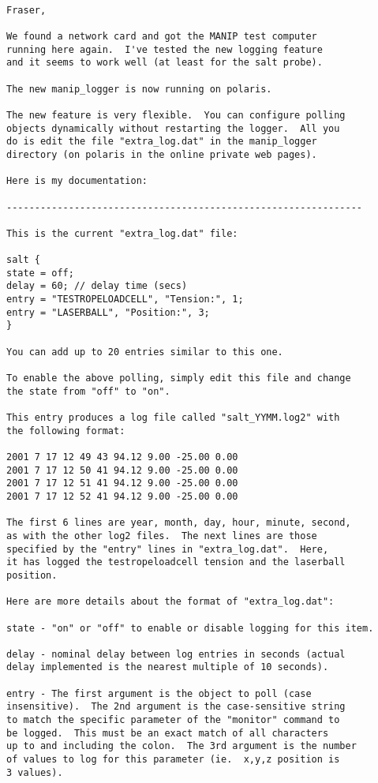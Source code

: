 \begin{verbatim}

Fraser,

We found a network card and got the MANIP test computer
running here again.  I've tested the new logging feature
and it seems to work well (at least for the salt probe).

The new manip_logger is now running on polaris.

The new feature is very flexible.  You can configure polling
objects dynamically without restarting the logger.  All you
do is edit the file "extra_log.dat" in the manip_logger
directory (on polaris in the online private web pages).

Here is my documentation:

--------------------------------------------------------------- 

This is the current "extra_log.dat" file:

salt {
state = off;
delay = 60; // delay time (secs)
entry = "TESTROPELOADCELL", "Tension:", 1;
entry = "LASERBALL", "Position:", 3;
}

You can add up to 20 entries similar to this one.

To enable the above polling, simply edit this file and change
the state from "off" to "on".

This entry produces a log file called "salt_YYMM.log2" with
the following format:

2001 7 17 12 49 43 94.12 9.00 -25.00 0.00
2001 7 17 12 50 41 94.12 9.00 -25.00 0.00
2001 7 17 12 51 41 94.12 9.00 -25.00 0.00
2001 7 17 12 52 41 94.12 9.00 -25.00 0.00

The first 6 lines are year, month, day, hour, minute, second,
as with the other log2 files.  The next lines are those
specified by the "entry" lines in "extra_log.dat".  Here,
it has logged the testropeloadcell tension and the laserball
position.

Here are more details about the format of "extra_log.dat":

state - "on" or "off" to enable or disable logging for this item.

delay - nominal delay between log entries in seconds (actual
delay implemented is the nearest multiple of 10 seconds).

entry - The first argument is the object to poll (case
insensitive).  The 2nd argument is the case-sensitive string
to match the specific parameter of the "monitor" command to
be logged.  This must be an exact match of all characters
up to and including the colon.  The 3rd argument is the number
of values to log for this parameter (ie.  x,y,z position is
3 values).


\end{verbatim}
